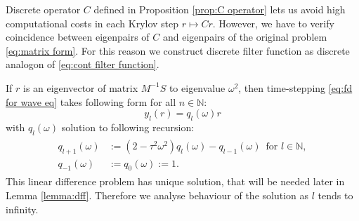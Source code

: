 \documentclass[a4paper,11pt,bibliography=totoc,listof=totoc,headinclude=true,cleardoublepage=empty,oneside]{scrbook}
\newcommand{\N}{\mathbb{N}}
\begin{document}
Discrete operator $C$ defined in Proposition \ref{prop:C operator} lets us avoid high computational costs in each Krylov step $r \mapsto Cr$. However, we have to verify coincidence between eigenpairs of $C$ and eigenpairs of the original problem \eqref{eq:matrix form}. For this reason we construct discrete filter function as discrete analogon of \eqref{eq:cont filter function}. 

If $r$ is an eigenvector of matrix $M^{-1}S$ to eigenvalue $\omega^2$, then time-stepping \eqref{eq:fd for wave eq} takes following form for all $n\in \N$:
\begin{equation}\label{eq:y_l q_l}
    y_l(r) = q_l(\omega)r  
\end{equation}
with $q_l(\omega)$ solution to following recursion:
\begin{align}\label{eq:q def}
    \begin{split}
        q_{l+1}(\omega) &:= (2-\tau^2\omega^2) q_l(\omega) - q_{l-1}(\omega) \, \text{ for } l \in \N,\\
        q_{-1}(\omega) &:= q_0(\omega) := 1.
    \end{split}
\end{align}
This linear difference problem has unique solution, that will be needed later in Lemma \ref{lemma:dff}. Therefore we analyse behaviour of the solution as $l$ tends to infinity.
\end{document}
